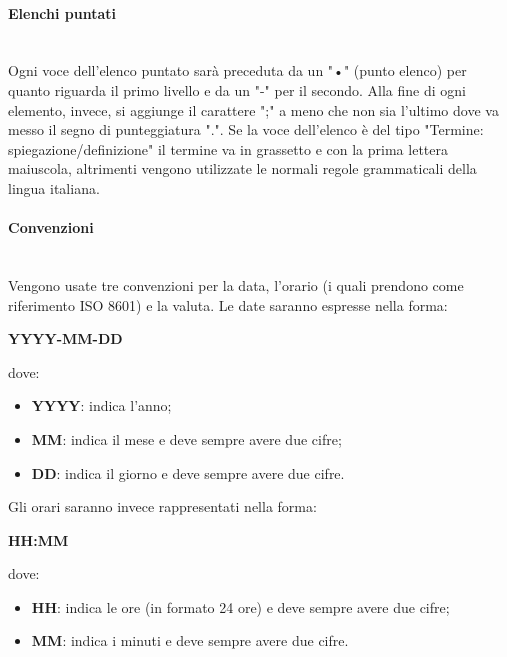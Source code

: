             \paragraph*{Elenchi puntati}\mbox{}\\ [1mm]
                Ogni voce dell'elenco puntato sarà preceduta da un "•" (punto elenco) per quanto riguarda il primo livello e da un "-" per il secondo.
                Alla fine di ogni elemento, invece, si aggiunge il carattere ";" a meno che non sia l'ultimo dove va messo il segno di punteggiatura ".".
                Se la voce dell'elenco è del tipo "Termine: spiegazione/definizione" il termine va in grassetto e con la prima lettera maiuscola, altrimenti vengono utilizzate le normali regole grammaticali della lingua italiana.
            \paragraph*{Convenzioni}\mbox{}\\ [1mm]
                Vengono usate tre convenzioni per la data, l'orario (i quali prendono come riferimento ISO 8601) e la valuta. Le date saranno espresse nella forma: \newline \newline
                \centerline{\textbf{YYYY-MM-DD}} \newline \newline
                dove:
                \begin{itemize}
                    \item \textbf{YYYY}: indica l'anno;
                    \item \textbf{MM}: indica il mese e deve sempre avere due cifre;
                    \item \textbf{DD}: indica il giorno e deve sempre avere due cifre.
                \end{itemize}
                Gli orari saranno invece rappresentati nella forma: \newline \newline
                \centerline{\textbf{HH:MM}} \newline \newline
                dove:
                \begin{itemize}
                    \item \textbf{HH}: indica le ore (in formato 24 ore) e deve sempre avere due cifre;
                    \item \textbf{MM}: indica i minuti e deve sempre avere due cifre.
                \end{itemize}
